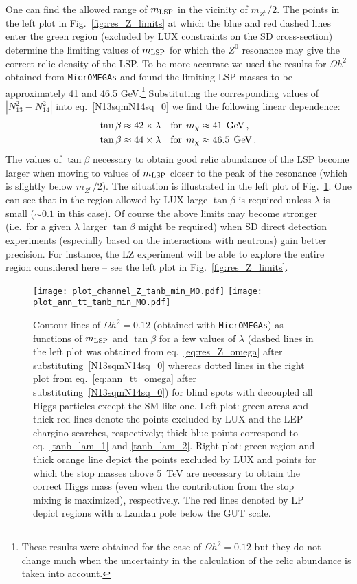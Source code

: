 \documentclass[12pt,twoside]{article}
\begin{document}
One can find the allowed range of $m_{\rm LSP}$ in the vicinity of $m_{Z^0}/2$. 
The points in the left plot in Fig.~\ref{fig:res_Z_limits} at which the 
blue and red dashed lines enter the green region (excluded by LUX
 constraints on the SD cross-section) determine the limiting values 
of $m_{\rm LSP}$ for which the $Z^0$ resonance may give the 
correct relic density of the LSP. 
To be more accurate we used the results for $\Omega h^2$ obtained from 
\texttt{MicrOMEGAs} and found the limiting LSP masses to be approximately
41 and 46.5 GeV.\footnote{These 
results were obtained for the case 
of $\Omega h^2=0.12$ but they do not change much when the uncertainty 
in the calculation of the relic abundance is taken into account.} 
Substituting the corresponding values of 
$|N_{13}^2-N_{14}^2|$ into eq.~\eqref{N13sqmN14sq_0} we find the following 
linear dependence:
%
\begin{align}
\label{tanb_lam_1}
\tan\beta&\approx 42\times\lambda\quad {\rm for}\;\, 
m_\chi\approx 41\;\,{\rm GeV}\,,\\
\label{tanb_lam_2}
\tan\beta&\approx 44\times\lambda\quad {\rm for}\;\, 
m_\chi\approx 46.5\;\,{\rm GeV}\,.
\end{align}
%
%
The values of $\tan\beta$ necessary to obtain good relic abundance 
of the LSP become larger when moving to values of $m_{\rm LSP}$ closer to the 
peak of the resonance (which is slightly below $m_{Z^0}/2$). The situation is 
illustrated in the left plot of Fig.~\ref{fig:channel_Z_om_0}.
One can see that in the region allowed by LUX large $\tan\beta$ is required 
unless $\lambda$ is small ($\sim0.1$ in this case). 
Of course the above limits may become stronger (i.e.~for a given $\lambda$ 
larger $\tan\beta$ might be required) when SD direct detection experiments 
(especially based on the interactions with neutrons) gain better precision. 
For instance, the LZ experiment will be able to explore the entire region 
considered here -- see the left plot in Fig.~\ref{fig:res_Z_limits}. 
%
%
\begin{figure}[t]
\center
\texttt{[image: plot\_channel\_Z\_tanb\_min\_MO.pdf]}
\texttt{[image: plot\_ann\_tt\_tanb\_min\_MO.pdf]}
\caption{Contour lines of $\Omega h^2=0.12$ (obtained with \texttt{MicrOMEGAs}) 
as functions of $m_{\rm LSP}$ and $\tan\beta$ for a few values of $\lambda$ 
(dashed lines in the left plot was obtained from eq.~\eqref{eq:res_Z_omega} 
after substituting~\eqref{N13sqmN14sq_0} whereas dotted lines in the right plot 
from eq.~\eqref{eq:ann_tt_omega} after substituting~\eqref{N13sqmN14sq_0}) 
for blind spots with decoupled all Higgs particles except the SM-like one. 
Left plot: green areas and thick red lines denote the points excluded by LUX 
and the LEP chargino searches, respectively;
thick blue points correspond to eq.~\ref{tanb_lam_1} and \ref{tanb_lam_2}. 
Right plot: green region and thick orange line depict the points excluded 
by LUX and points for which the stop masses above 5~TeV are necessary 
to obtain the correct Higgs mass (even when the contribution from the stop mixing is maximized), respectively. The red lines denoted 
by LP depict regions with a Landau pole below the GUT scale.
}
\label{fig:channel_Z_om_0}
\end{figure}
%
%
\end{document}
